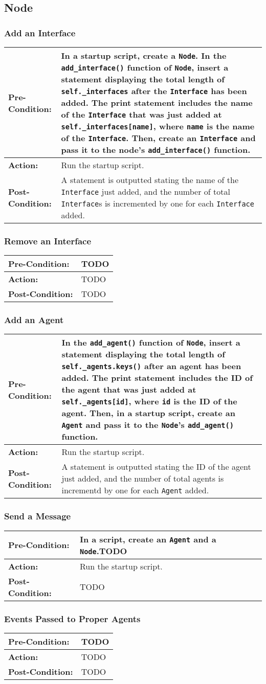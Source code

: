 \documentclass[titlepage]{article}
\newcommand{\testcase}[3]{
    \begin{center}
    \begin{tabular}{| l | p{0.7\textwidth}|}
        \hline
        \rowcolor[gray]{0.8}\textbf{Pre-Condition:} & #1 \\ \hline
        \textbf{Action:} & #2 \\ \hline
        \rowcolor[gray]{0.8}\textbf{Post-Condition:} & #3 \\ \hline
    \end{tabular}
    \end{center}
}
\begin{document}
\subsection{Node}
\subsubsection{Add an Interface}
\testcase{In a startup script, create a \texttt{Node}.  In the \texttt{add\_interface()} function of \texttt{Node}, insert a statement displaying the total length of \texttt{self.\_interfaces} after the \texttt{Interface} has been added. The print statement includes the name of the \texttt{Interface} that was just added at \texttt{self.\_interfaces[name]}, where \texttt{name} is the name of the \texttt{Interface}.  Then, create an \texttt{Interface} and pass it to the node's \texttt{add\_interface()} function.}{Run the startup script.}{A statement is outputted stating the name of the \texttt{Interface} just added, and the number of total \texttt{Interface}s is incremented by one for each \texttt{Interface} added.}

\subsubsection{Remove an Interface}
\testcase{TODO}{TODO}{TODO}

\subsubsection{Add an Agent}
\testcase{In the \texttt{add\_agent()} function of \texttt{Node}, insert a statement displaying the total length of \texttt{self.\_agents.keys()} after an agent has been added. The print statement includes the ID of the agent that was just added at \texttt{self.\_agents[id]}, where \texttt{id} is the ID of the agent.  Then, in a startup script, create an \texttt{Agent} and pass it to the \texttt{Node}'s \texttt{add\_agent()} function.}{Run the startup script.}{A statement is outputted stating the ID of the agent just added, and the number of total agents is incrementd by one for each \texttt{Agent} added.}

\subsubsection{Send a Message}
\testcase{In a script, create an \texttt{Agent} and a \texttt{Node}.TODO}{Run the startup script.}{TODO}

\subsubsection{Events Passed to Proper Agents}
\testcase{TODO}{TODO}{TODO}
\end{document}
